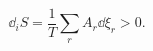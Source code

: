 \documentclass[10pt, a4paper, twoside, onecolumn]{article}
\numberwithin{equation}{section}
\begin{document}
	\begin{equation}
		\dd_{i}S=\frac{1}{T}\sum_{r}A_{r}\dd{\xi_{r}}>0.
	\end{equation}
	
\end{document}
